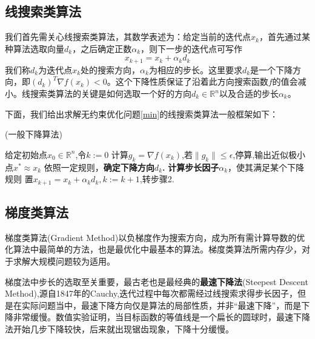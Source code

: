 \subsection{线搜索类算法}

我们首先需关心线搜索类算法，其数学表述为：给定当前的迭代点$ x_{k} $，首先通过某种算法选取向量$ d_{k} $，之后确定正数$ \alpha_{k} $，则下一步的迭代点可写作
\begin{equation}
	x_{k+1}=x_{k}+\alpha_{k}d_{k}
\end{equation}
我们称$ d_{k} $为迭代点$x_{k}  $处的搜索方向，$  \alpha_{k}$为相应的步长。这里要求$ d_{k} $是一个下降方向，即$ (d_{k})^{T} \nabla f(x_{k}) <0$。这个下降性质保证了沿着此方向搜索函数$ f $的值会减小。线搜索类算法的关键是如何选取一个好的方向$ d_{k} \in \mathbb{R}^{n} $以及合适的步长$  \alpha_{k}$。

下面，我们给出求解无约束优化问题\ref{min}的线搜索类算法一般框架如下：

\begin{algorithm}[H]	
	\caption{(一般下降算法)}
	\renewcommand{\algorithmicrequire}{\textbf{输入:}} 
	\renewcommand{\algorithmicensure}{\textbf{输出:}}
	
	\begin{algorithmic}[1]
		\State  给定初始点$ x_{0} \in \mathbb{R}^{n} $,令$ k:=0 $
		\State  计算$ g_{k}=\nabla f(x_{k}) $,若$ \| g_{k} \| \leq \epsilon$,停算,输出近似极小点$ x^{*} \approx x_{k} $
		\State  依照一定规则，\textbf{确定下降方向$ d_{k} $.}
		\State  \textbf{计算步长因子$ \alpha_{k} $}，使其满足某个下降规则
		\State  置$ x_{k+1} = x_{k}+\alpha_{k}d_{k}, k:=k+1 $,转步骤2.
	\end{algorithmic}
\end{algorithm}	

\subsection{梯度类算法}

梯度类算法(Gradient Method)以负梯度作为搜索方向，成为所有需计算导数的优化算法中最简单的方法，也是最优化中最基本的算法。梯度类算法所需内存少，对于求解大规模问题较为适用。

梯度法中步长的选取至关重要，最古老也是最经典的\textbf{最速下降法}(Steepest Descent Method),源自1847年的Cauchy\cite{cauchy1847methode},迭代过程中每次都需经过线搜索求得步长因子，但是在实际问题当中，最速下降方向仅是算法的局部性质，并非“最速下降”，而是下降非常缓慢。数值实验证明，当目标函数的等值线是一个扁长的圆球时，最速下降法开始几步下降较快，后来就出现锯齿现象，下降十分缓慢\cite{akaike1959successive,forsythe1968asymptotic}。

